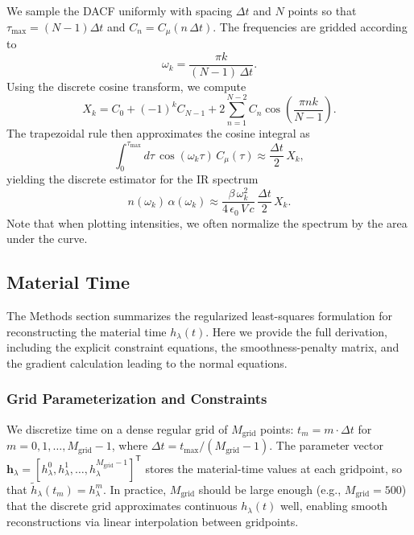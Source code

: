 We sample the DACF uniformly with spacing $\Delta t$ and $N$ points so that
$\tau_{\max} = (N-1) \Delta t$ and $C_n = C_\mu(n\,\Delta t)$. The frequencies are gridded according to
\begin{equation}
\omega_k = \frac{\pi k}{(N-1)\,\Delta t} .
\end{equation}
Using the discrete cosine transform, we compute
\begin{equation}
X_k = C_0 + (-1)^k C_{N-1} + 2 \sum_{n=1}^{N-2} C_n \cos\!\left(\frac{\pi n k}{N-1}\right) .
\end{equation}
The trapezoidal rule then approximates the cosine integral as
\begin{equation}
\int_{0}^{\tau_{\max}} d\tau \,\cos(\omega_k \tau)\, C_\mu(\tau) \approx \frac{\Delta t}{2}\,X_k ,
\end{equation}
yielding the discrete estimator for the IR spectrum
\begin{equation}
n(\omega_k)\,\alpha(\omega_k) \approx \frac{\beta\,\omega_k^{2}}{4\,\epsilon_0\,V\,c}\,\frac{\Delta t}{2}\,X_k .
\end{equation}
Note that when plotting intensities, we often normalize the spectrum by the area under the curve.


\subsection{Material Time}  \label{app:mattime}

The Methods section summarizes the regularized least-squares formulation for reconstructing the material time $h_\lambda(t)$. Here we provide the full derivation, including the explicit constraint equations, the smoothness-penalty matrix, and the gradient calculation leading to the normal equations.

\subsubsection{Grid Parameterization and Constraints}

We discretize time on a dense regular grid of $M_\mathrm{grid}$ points: $t_m = m \cdot \Delta t$ for $m = 0, 1, \ldots, M_\mathrm{grid}-1$, where $\Delta t = t_{\max}/(M_\mathrm{grid}-1)$.
The parameter vector $\boldsymbol{h}_\lambda = [h_{\lambda}^0, h_{\lambda}^1, \ldots, h_{\lambda}^{M_\mathrm{grid}-1}]^\mathsf{T}$ stores the material-time values at each gridpoint, so that $\tilde{h}_\lambda(t_m) = h_\lambda^m$.
In practice, $M_\mathrm{grid}$ should be large enough (e.g., $M_\mathrm{grid} = 500$) that the discrete grid approximates continuous $h_\lambda(t)$ well, enabling smooth reconstructions via linear interpolation between gridpoints.

